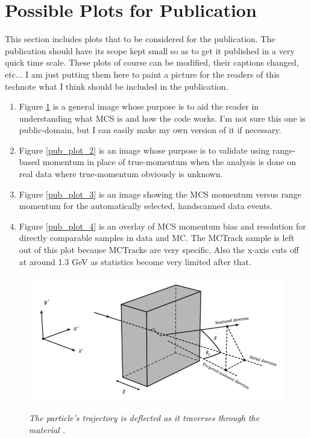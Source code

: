 \section{Possible Plots for Publication}\label{publicplots_section}
This section includes plots that to be considered for the publication. The publication should have its scope kept small so as to get it published in a very quick time scale. These plots of course can be modified, their captions changed, etc... I am just putting them here to paint a picture for the readers of this technote what I think should be included in the publication.
\begin{enumerate}
	\item Figure \ref{pub_plot_1} is a general image whose purpose is to aid the reader in understanding what MCS is and how the code works. I'm not sure this one is public-domain, but I can easily make my own version of it if necessary.
	\item Figure \ref{pub_plot_2} is an image whose purpose is to validate using range-based momentum in place of true-momentum when the analysis is done on real data where true-momentum obviously is unknown.
	\item Figure \ref{pub_plot_3} is an image showing the MCS momentum versus range momentum for the automatically selected, handscanned data events.
	\item Figure \ref{pub_plot_4} is an overlay of MCS momentum bias and resolution for directly comparable samples in data and MC. The {\sc MCTrack} sample is left out of this plot because {\sc MCTracks} are very {\ub} specific. Also the x-axis cuts off at around 1.3 GeV as statistics become very limited after that.
\end{enumerate}

\begin{figure}[ht!]
\centering
	\includegraphics[width=0.5\linewidth]{Figures/static_figs/mcs_nocap.png} \\
\caption{\textit{The particle's trajectory is deflected as it traverses through the material \cite{leonidas1}.}}\label{pub_plot_1}
\end{figure}

